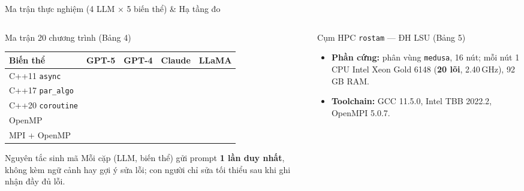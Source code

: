 \documentclass[aspectratio=169,10pt]{beamer}
\newcommand{\code}[1]{\texttt{\color{BlueDark}#1}}
\newcommand{\ok}[1]{\textcolor{OkGreen}{\bfseries #1}}
\begin{document}
\begin{frame}{Ma trận thực nghiệm (4 LLM $\times$ 5 biến thể) \& Hạ tầng đo}
\begin{columns}[T,totalwidth=\textwidth]
  \begin{column}{0.485\textwidth}
    \begin{bluebox}[height=3.65cm]{Ma trận 20 chương trình (Bảng 4)}
      \centering
      \scriptsize
      \renewcommand{\arraystretch}{1.24}
      \begin{tabular}{@{}lcccc@{}}
        \toprule
        \textbf{Biến thể} & \textbf{GPT-5} & \textbf{GPT-4} & \textbf{Claude} & \textbf{LLaMA} \\
        \midrule
        C++11 \code{async}     & \ok{\checkmark} & \ok{\checkmark} & \ok{\checkmark} & \ok{\checkmark} \\
        C++17 \code{par\_algo} & \ok{\checkmark} & \ok{\checkmark} & \ok{\checkmark} & \ok{\checkmark} \\
        C++20 \code{coroutine} & \ok{\checkmark} & \ok{\checkmark} & \ok{\checkmark} & \ok{\checkmark} \\
        OpenMP                 & \ok{\checkmark} & \ok{\checkmark} & \ok{\checkmark} & \ok{\checkmark} \\
        MPI + OpenMP           & \ok{\checkmark} & \ok{\checkmark} & \ok{\checkmark} & \ok{\checkmark} \\
        \bottomrule
      \end{tabular}
    \end{bluebox}
    \vspace{0.22cm}
    \begin{hboxcard}[height=1.72cm]{Nguyên tắc sinh mã}
      \scriptsize Mỗi cặp (LLM, biến thể) gửi prompt \textbf{1 lần duy nhất}, không kèm ngữ cảnh hay gợi ý sửa lỗi; con người chỉ sửa tối thiểu sau khi ghi nhận đầy đủ lỗi.
    \end{hboxcard}
  \end{column}
  \begin{column}{0.485\textwidth}
    \begin{bluebox}[height=3.65cm]{Cụm HPC \texttt{rostam} --- ĐH LSU (Bảng 5)}
      \begin{itemize}\scriptsize\setlength{\itemsep}{2.5pt}
        \item \textbf{Phần cứng:} phân vùng \code{medusa}, 16 nút; mỗi nút 1 CPU Intel Xeon Gold 6148 (\textbf{20 lõi}, 2.40\,GHz), 92\,GB RAM.
        \item \textbf{Toolchain:} GCC 11.5.0, Intel TBB 2022.2, OpenMPI 5.0.7.

\end{itemize}
\end{bluebox}
\end{column}
\end{columns}
\end{frame}
\end{document}
